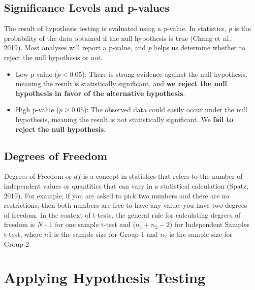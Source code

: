 \documentclass{article}
\begin{document}
\subsection{Significance Levels and p-values}

The result of hypothesis testing is evaluated using a p-value. In statistics, \textit{p} is the probability of the data obtained if the null hypothesis is true (Chang et al., 2019). Most analyses will report a p-value, and \textit{p} helps us determine whether to reject the null hypothesis or not.

\begin{itemize}
\item Low p-value (\begin{math} p < 0.05 \end{math}): There is strong evidence against the null hypothesis, meaning the result is statistically significant, and\textbf{ we reject the null hypothesis in favor of the alternative hypothesis}.

\item High p-value (\begin{math} p  \geq 0.05\end{math}): The observed data could easily occur under the null hypothesis, meaning the result is not statistically significant. We \textbf{fail to reject the null hypothesis}.

\end{itemize}

\subsection{Degrees of Freedom}

Degrees of Freedom or $df$ is a concept in statistics that refers to the number of independent values or quantities that can vary in a statistical calculation (Spatz, 2019). For example, if you are asked to pick two numbers and there are no restrictions, then both numbers are free to have any value; you have two degrees of freedom. In the context of t-tests, the general rule for calculating degrees of freedom is \textit{N} - 1 for one sample t-test and (\begin{math} n_1 + n_2 -2\end{math}) for Independent Samples t-test, where $n1$ is the sample size for Group 1 and $n_2$ is the sample size for Group 2


\section{Applying Hypothesis Testing}
\end{document}
